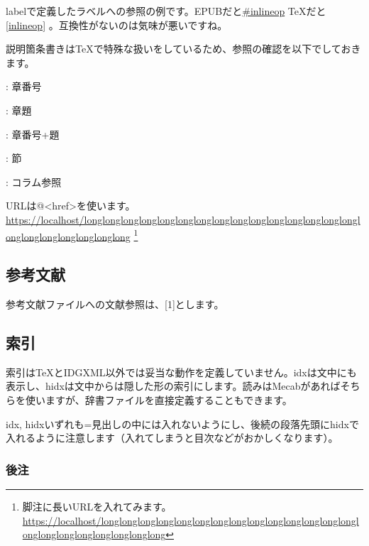labelで定義したラベルへの参照の例です。EPUBだと\hyperref[inlineop]{\#inlineop} TeXだと\ref{inlineop} 。互換性がないのは気味が悪いですね。

説明箇条書きはTeXで特殊な扱いをしているため、参照の確認を以下でしておきます。

: 章番号

: 章題

: 章番号+題

: 節

: コラム参照

URLは@\textless{}href\textgreater{}を使います。\href{https://localhost/longlonglonglonglonglonglonglonglonglonglonglonglonglonglonglonglonglonglonglonglonglong}{https://localhost/longlonglonglonglonglonglonglonglonglonglonglonglonglonglonglonglonglonglonglonglonglong} \footnote{脚注に長いURLを入れてみます。\href{https://localhost/longlonglonglonglonglonglonglonglonglonglonglonglonglonglonglonglonglonglonglonglonglong}{https://localhost/longlonglonglonglonglonglonglonglonglonglonglonglonglonglonglonglonglonglonglonglonglong}}

\subsection{参考文献}
\label{sec:2-4-4}

参考文献ファイルへの文献参照は、[1]とします。

\subsection{索引}
\label{sec:2-4-5}

索引はTeXとIDGXML以外では妥当な動作を定義していません。idxは文中にも表示し、hidxは文中からは隠した形の索引にします。読みはMecabがあればそちらを使いますが、辞書ファイルを直接定義することもできます。

idx, hidxいずれも=見出しの中には入れないようにし、後続の段落先頭にhidxで入れるように注意します（入れてしまうと目次などがおかしくなります）。

\subsubsection{後注}
\label{sec:2-4-5-1}

